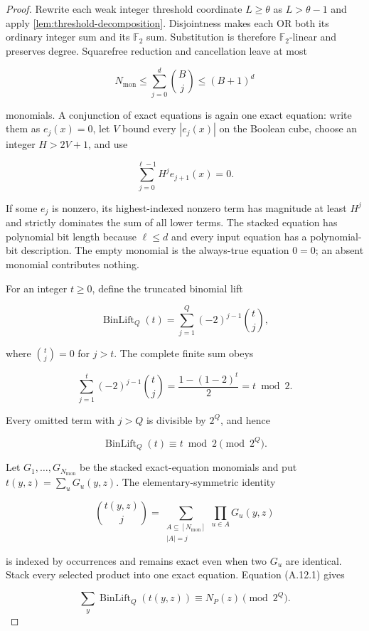 \documentclass[11pt,letterpaper]{article}
\newcommand{\cref}[1]{\ref{#1}}
\theoremstyle{definition}
\theoremstyle{remark}
\begin{document}
\begin{proof} Rewrite each weak integer threshold coordinate
\(L\ge\theta\) as \(L>\theta-1\) and apply
\cref{lem:threshold-decomposition}. Disjointness makes each OR both its
ordinary integer sum and its \(\mathbb F_2\) sum. Substitution is
therefore \(\mathbb F_2\)-linear and preserves degree. Squarefree
reduction and cancellation leave at most

\[
N_{\mathrm{mon}}
\le
\sum_{j=0}^d\binom Bj
\le
(B+1)^d
\]

monomials. A conjunction of exact equations is again one exact equation:
write them as \(e_j(x)=0\), let \(V\) bound every \(|e_j(x)|\) on the
Boolean cube, choose an integer \(H>2V+1\), and use

\[
\sum_{j=0}^{\ell-1}H^je_{j+1}(x)=0.
\]

If some \(e_j\) is nonzero, its highest-indexed nonzero term has
magnitude at least \(H^j\) and strictly dominates the sum of all lower
terms. The stacked equation has polynomial bit length because
\(\ell\le d\) and every input equation has a polynomial-bit description.
The empty monomial is the always-true equation \(0=0\); an absent
monomial contributes nothing.

For an integer \(t\ge0\), define the truncated binomial lift

\[
\operatorname{BinLift}_Q(t)
{}={}
\sum_{j=1}^{Q}
(-2)^{j-1}\binom tj,
\]

where \(\binom tj=0\) for \(j>t\). The complete finite sum obeys

\[
\sum_{j=1}^{t}
(-2)^{j-1}\binom tj
{}={}
\frac{1-(1-2)^t}{2}
{}={}
t\bmod2.
\]

Every omitted term with \(j>Q\) is divisible by \(2^Q\), and hence

\[
\operatorname{BinLift}_Q(t)
\equiv
t\bmod2
\pmod{2^Q}.
\tag{A.12.1}
\]

Let \(G_1,\ldots,G_{N_{\mathrm{mon}}}\) be the stacked exact-equation
monomials and put \(t(y,z)=\sum_uG_u(y,z)\). The elementary-symmetric
identity

\[
\binom{t(y,z)}j
{}={}
\sum_{\substack{A\subseteq[N_{\mathrm{mon}}]\\|A|=j}}
\prod_{u\in A}G_u(y,z)
\]

is indexed by occurrences and remains exact even when two \(G_u\) are
identical. Stack every selected product into one exact equation.
Equation (A.12.1) gives

\[
\sum_y\operatorname{BinLift}_Q(t(y,z))
\equiv
N_P(z)
\pmod{2^Q}.
\]


\end{proof}
\end{document}
